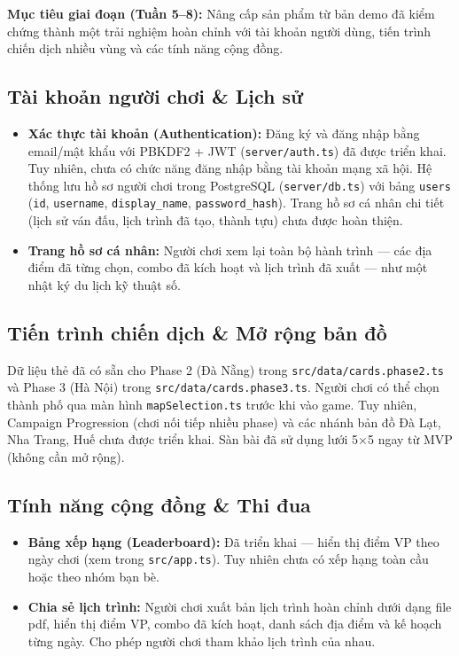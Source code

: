 \textbf{Mục tiêu giai đoạn (Tuần 5--8):} Nâng cấp sản phẩm từ bản demo đã kiểm chứng thành một trải nghiệm hoàn chỉnh với tài khoản người dùng, tiến trình chiến dịch nhiều vùng và các tính năng cộng đồng.

\subsection{Tài khoản người chơi \& Lịch sử}

\begin{itemize}[topsep=0pt, itemsep=2.5pt, leftmargin=1.5cm]
    \item \textbf{Xác thực tài khoản (Authentication):} Đăng ký và đăng nhập bằng email/mật khẩu với PBKDF2 + JWT (\texttt{server/auth.ts}) đã được triển khai. Tuy nhiên, chưa có chức năng đăng nhập bằng tài khoản mạng xã hội. Hệ thống lưu hồ sơ người chơi trong PostgreSQL (\texttt{server/db.ts}) với bảng \texttt{users} (\texttt{id}, \texttt{username}, \texttt{display\_name}, \texttt{password\_hash}). Trang hồ sơ cá nhân chi tiết (lịch sử ván đấu, lịch trình đã tạo, thành tựu) chưa được hoàn thiện.

    \item \textbf{Trang hồ sơ cá nhân:} Người chơi xem lại toàn bộ hành trình --- các địa điểm đã từng chọn, combo đã kích hoạt và lịch trình đã xuất --- như một nhật ký du lịch kỹ thuật số.
\end{itemize}

\subsection{Tiến trình chiến dịch \& Mở rộng bản đồ}

Dữ liệu thẻ đã có sẵn cho Phase 2 (Đà Nẵng) trong \texttt{src/data/cards.phase2.ts} và Phase 3 (Hà Nội) trong \texttt{src/data/cards.phase3.ts}. Người chơi có thể chọn thành phố qua màn hình \texttt{mapSelection.ts} trước khi vào game. Tuy nhiên, Campaign Progression (chơi nối tiếp nhiều phase) và các nhánh bản đồ Đà Lạt, Nha Trang, Huế chưa được triển khai. Sàn bài đã sử dụng lưới 5×5 ngay từ MVP (không cần mở rộng).

\subsection{Tính năng cộng đồng \& Thi đua}

\begin{itemize}[topsep=0pt, itemsep=2.5pt, leftmargin=1.5cm]
    \item \textbf{Bảng xếp hạng (Leaderboard):} Đã triển khai — hiển thị điểm VP theo ngày chơi (xem trong \texttt{src/app.ts}). Tuy nhiên chưa có xếp hạng toàn cầu hoặc theo nhóm bạn bè.

    \item \textbf{Chia sẻ lịch trình:} Người chơi xuất bản lịch trình hoàn chỉnh dưới dạng file pdf, hiển thị điểm VP, combo đã kích hoạt, danh sách địa điểm và kế hoạch từng ngày. Cho phép người chơi tham khảo lịch trình của nhau.
\end{itemize}

